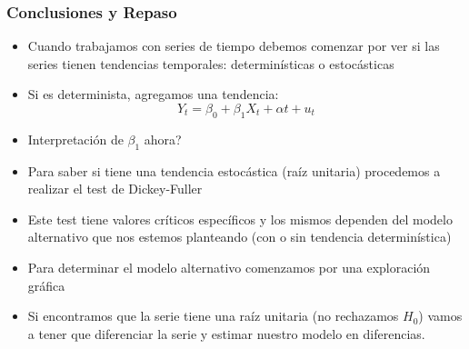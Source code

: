 \documentclass{beamer}
\begin{document}
\begin{frame}[shrink=10]
\frametitle{Conclusiones y Repaso}

\begin{itemize}
    \item Cuando trabajamos con series de tiempo debemos comenzar por ver si las series tienen tendencias temporales: determin\'isticas o estoc\'asticas
    \item Si es determinista, agregamos una tendencia:
    \[
    Y_t = \beta_0 + \beta_1 X_t + \alpha t + u_t
    \]
    \item Interpretaci\'on de $\beta_1$ ahora?
    \item Para saber si tiene una tendencia estoc\'astica (ra\'iz unitaria) procedemos a realizar el test de Dickey-Fuller
    \item Este test tiene valores cr\'iticos espec\'ificos y los mismos dependen del modelo alternativo que nos estemos planteando (con o sin tendencia determin\'istica)
    \item Para determinar el modelo alternativo comenzamos por una exploraci\'on gr\'afica
    \item Si encontramos que la serie tiene una ra\'iz unitaria (no rechazamos $H_0$) vamos a tener que diferenciar la serie y estimar nuestro modelo en diferencias.
\end{itemize}

\end{frame}


\end{document}
